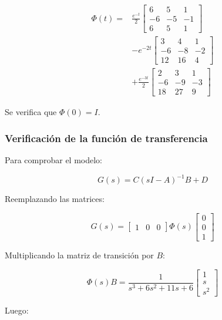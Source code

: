 \documentclass[12pt,a4paper]{article}
\begin{document}
\begin{equation}\boxed{\begin{aligned}\Phi(t)={}&\frac{e^{-t}}{2} \begin{bmatrix}6&5&1\\-6&-5&-1\\6&5&1\end{bmatrix}\\[6pt]&-e^{-2t} \begin{bmatrix}3&4&1\\-6&-8&-2\\12&16&4\end{bmatrix}\\[6pt]&+\frac{e^{-3t}}{2} \begin{bmatrix}2&3&1\\-6&-9&-3\\18&27&9\end{bmatrix}\end{aligned}}\end{equation}

Se verifica que $\Phi(0)=I$.
\subsubsection*{Verificación de la función de transferencia}
Para comprobar el modelo:

\begin{equation}G(s)=C(sI-A)^{-1}B+D\end{equation}

Reemplazando las matrices:

\begin{equation}G(s)=\begin{bmatrix}1&0&0\end{bmatrix} \Phi(s) \begin{bmatrix}0\\0\\1\end{bmatrix}\end{equation}

Multiplicando la matriz de transición por $B$:

\begin{equation}\Phi(s)B=\frac{1}{s^3+6s^2+11s+6} \begin{bmatrix}1\\s\\s^2\end{bmatrix}\end{equation}

Luego:
\end{document}
